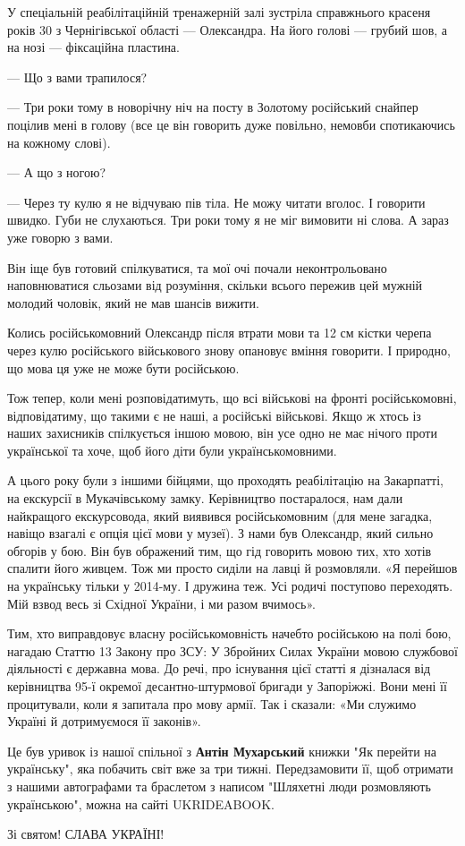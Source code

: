 У спеціальній реабілітаційній тренажерній залі зустріла справжнього красеня
років 30 з Чернігівської області — Олександра. На його голові — грубий шов, а
на нозі — фіксаційна пластина.

— Що з вами трапилося?

— Три роки тому в новорічну ніч на посту в Золотому російський снайпер поцілив
мені в голову (все це він говорить дуже повільно, немовби спотикаючись на
кожному слові).

— А що з ногою?

— Через ту кулю я не відчуваю пів тіла. Не можу читати вголос. І говорити
швидко. Губи не слухаються. Три роки тому я не міг вимовити ні слова. А зараз
уже говорю з вами.

Він іще був готовий спілкуватися, та мої очі почали неконтрольовано
наповнюватися сльозами від розуміння, скільки всього пережив цей мужній молодий
чоловік, який не мав шансів вижити.

Колись російськомовний Олександр після втрати мови та 12 см кістки черепа через
кулю російського військового знову опановує вміння говорити. І природно, що
мова ця уже не може бути російською.

Тож тепер, коли мені розповідатимуть, що всі військові на фронті
російськомовні, відповідатиму, що такими є не наші, а російські військові. Якщо
ж хтось із наших захисників спілкується іншою мовою, він усе одно не має нічого
проти української та хоче, щоб його діти були українськомовними.

А цього року були з іншими бійцями, що проходять реабілітацію на Закарпатті, на
екскурсії в Мукачівському замку. Керівництво постаралося, нам дали найкращого
екскурсовода, який виявився російськомовним (для мене загадка, навіщо взагалі є
опція цієї мови у музеї). З нами був Олександр, який сильно обгорів у бою. Він
був ображений тим, що гід говорить мовою тих, хто хотів спалити його живцем.
Тож ми просто сиділи на лавці й розмовляли. «Я перейшов на українську тільки у
2014-му. І дружина теж. Усі родичі поступово переходять. Мій взвод весь зі
Східної України, і ми разом вчимось».

Тим, хто виправдовує власну російськомовність начебто російською на полі бою,
нагадаю Статтю 13 Закону про ЗСУ: У Збройних Силах України мовою службової
діяльності є державна мова. До речі, про існування цієї статті я дізналася від
керівництва 95-ї окремої десантно-штурмової бригади у Запоріжжі. Вони мені її
процитували, коли я запитала про мову армії. Так і сказали: «Ми служимо Україні
й дотримуємося її законів».

Це був уривок із нашої спільної з \textbf{Антін Мухарський} книжки "Як перейти на
українську", яка побачить світ вже за три тижні. Передзамовити її, щоб отримати
з нашими автографами та браслетом з написом "Шляхетні люди розмовляють
українською", можна на сайті UKRIDEABOOK.

Зі святом! СЛАВА УКРАЇНІ!
